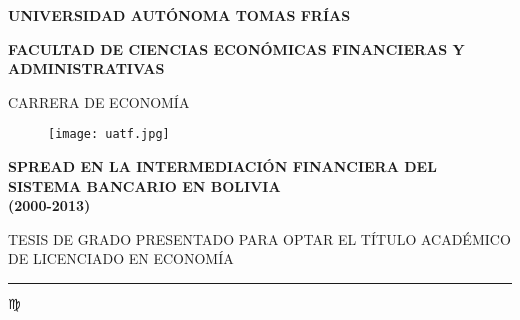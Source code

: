 \documentclass[12pt,letterpaper]{article}
\author{Edwin Huacanchi S.}
\begin{document}
	
	\begin{titlepage}
		
		\begin{center}
			
			\vspace*{-1.5in}
			
			
			{\fontsize{14}{15}\bf \selectfont UNIVERSIDAD AUTÓNOMA TOMAS FRÍAS}\\
			
			\vspace*{0.5cm}
			
			{\fontsize{12}{15}\bf \selectfont FACULTAD DE CIENCIAS ECONÓMICAS FINANCIERAS Y ADMINISTRATIVAS\\ }
			
			\vspace*{0.15in} CARRERA DE ECONOMÍA \\
			
			\vspace*{0.2in}
			
			\begin{figure}[htb]
				
				\begin{center}
					
					\texttt{[image: uatf.jpg]}
					
				\end{center}
				
			\end{figure}
			
			\begin{Large}
				
				\textbf{SPREAD EN LA INTERMEDIACIÓN FINANCIERA DEL SISTEMA BANCARIO EN BOLIVIA\\
					
					(2000-2013)} \\
				
			\end{Large}
			
			\vspace*{0.3in}
			
			\begin{large}
				
				TESIS DE GRADO PRESENTADO PARA OPTAR EL TÍTULO ACADÉMICO DE LICENCIADO EN ECONOMÍA\\
				
				\rule{20mm}{0.1mm}
				
				$\virgo$ %
				

\end{large}
\end{center}
\end{titlepage}
\end{document}
